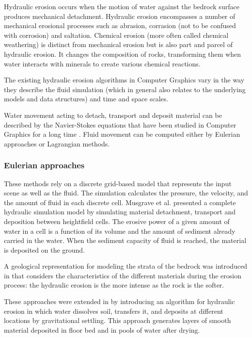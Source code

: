 \documentclass{article}
\begin{document}
Hydraulic erosion occurs when the motion of water against the bedrock surface produces mechanical detachment. Hydraulic erosion encompasses a number of mechanical erosional processes such as abrasion, corrasion (not to be confused with corrosion) and saltation. Chemical erosion (more often called chemical weathering) is distinct from mechanical erosion but is also part and parcel of hydraulic erosion. It changes the composition of rocks, transforming them when water interacts with minerals to create various chemical reactions.

The existing hydraulic erosion algorithms in Computer Graphics vary in the way they describe the fluid simulation (which in general also relates to the underlying models and data structures) and time and space scales.

Water movement acting to detach, transport and deposit material can be described by the Navier-Stokes equations \cite{CF88} that have been studied in Computer Graphics for a long time \cite{Bri08}. Fluid movement can be computed either by Eulerian approaches or Lagrangian methods.

\subsubsection{Eulerian approaches}

These methods rely on a discrete grid-based model that represents the input scene as well as the fluid. The simulation calculates the pressure, the velocity, and the amount of fluid in each discrete cell. Musgrave et al. \cite{MKM89} presented a complete hydraulic simulation model by simulating material detachment, transport and deposition between heightfield cells. The erosive power of a given amount of water in a cell is a function of its volume and the amount of sediment already carried in the water. When the sediment capacity of fluid is reached, the material is deposited on the ground.

A geological representation for modeling the strata of the bedrock was introduced in \cite{RPP93} that considers the characteristics of the different materials during the erosion process: the hydraulic erosion is the more intense as the rock is the softer.

These approaches were extended in \cite{BF02} by introducing an algorithm for hydraulic erosion in which water dissolves soil, transfers it, and deposits at different locations by gravitational settling. This approach generates layers of smooth material deposited in floor bed and in pools of water after drying.
\end{document}
